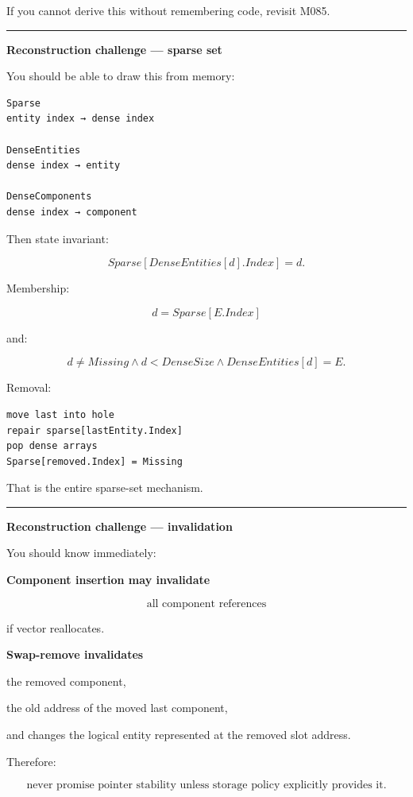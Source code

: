 If you cannot derive this without remembering code, revisit M085.

\begin{center}\rule{0.5\linewidth}{0.5pt}\end{center}

\textbf{Reconstruction challenge --- sparse set}

You should be able to draw this from memory:

\begin{verbatim}
Sparse
entity index → dense index

DenseEntities
dense index → entity

DenseComponents
dense index → component
\end{verbatim}

Then state invariant:

\[
Sparse[DenseEntities[d].Index]=d.
\]

Membership:

\[
d=Sparse[E.Index]
\]

and:

\[
d\neq Missing
\land
d<DenseSize
\land
DenseEntities[d]=E.
\]

Removal:

\begin{verbatim}
move last into hole
repair sparse[lastEntity.Index]
pop dense arrays
Sparse[removed.Index] = Missing
\end{verbatim}

That is the entire sparse-set mechanism.

\begin{center}\rule{0.5\linewidth}{0.5pt}\end{center}

\textbf{Reconstruction challenge --- invalidation}

You should know immediately:

\textbf{Component insertion may invalidate}

\[
\text{all component references}
\]

if vector reallocates.

\textbf{Swap-remove invalidates}

the removed component,

the old address of the moved last component,

and changes the logical entity represented at the removed slot address.

Therefore:

\[
\boxed{
\text{never promise pointer stability unless storage policy explicitly provides it}.
}
\]

